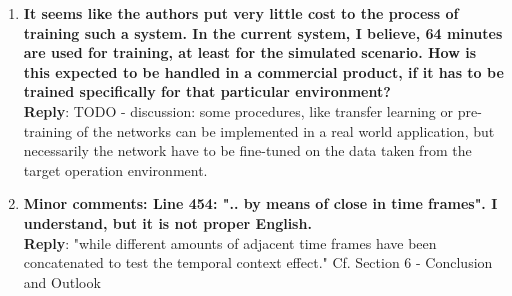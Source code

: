 \documentclass[11pt, technote, letterpaper, oneside, onecolumn]{IEEEtran}
\begin{document}
\begin{enumerate}
\item \textbf{It seems like the authors put very little cost to the process of training such a system. In the current system, I believe, 64 minutes are used for training, at least for the simulated scenario. How is this expected to be handled in a commercial product, if it has to be trained specifically for that particular environment?\\}
\textbf{Reply}:
TODO - discussion: some procedures, like transfer learning or pre-training of the networks can be implemented in a real world application, but necessarily the network have to be fine-tuned on the data taken from the target operation environment.

\item \textbf{Minor comments: Line 454: ".. by means of close in time frames". I understand, but it is not proper English.\\}
\textbf{Reply}: "while different amounts of adjacent time frames have been concatenated to test the temporal context effect." Cf. Section 6 - Conclusion and Outlook
\end{enumerate}

\newpage
\end{document}
